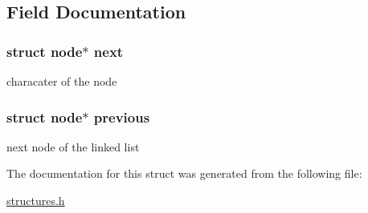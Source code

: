 \subsection{Field Documentation}
\hypertarget{structnode_a0dc1b6470487aa86d9936e3cab8b95be}{
\subsubsection[{next}]{\setlength{\rightskip}{0pt plus 5cm}struct {\bf node}$\ast$ next}}\label{structnode_a0dc1b6470487aa86d9936e3cab8b95be}
characater of the node \hypertarget{structnode_aba783da56f092df6846bd3b7b9555728}{
\subsubsection[{previous}]{\setlength{\rightskip}{0pt plus 5cm}struct {\bf node}$\ast$ previous}}\label{structnode_aba783da56f092df6846bd3b7b9555728}
next node of the linked list 

The documentation for this struct was generated from the following file\-:\begin{DoxyCompactItemize}
\item 
\hyperlink{structures_8h}{structures.\-h}\end{DoxyCompactItemize}
